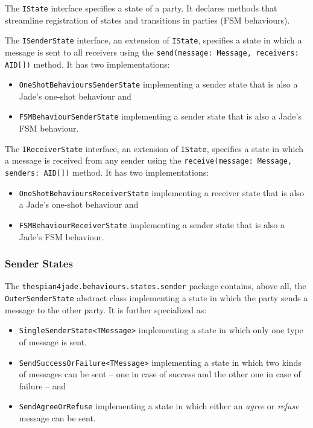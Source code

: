 The \texttt{IState} interface specifies a state of a party.
It declares methods that streamline registration of states and transitions in parties (FSM behaviours).

The \texttt{ISenderState} interface, an extension of \texttt{IState}, specifies a state in which a message is sent to all receivers using the \texttt{send(message: Message, receivers: AID[])} method.
It has two implementations:
\begin{itemize}
	\item \texttt{OneShotBehavioursSenderState} implementing a sender state that is also a Jade's one-shot behaviour and
	\item \texttt{FSMBehaviourSenderState} implementing a sender state that is also a Jade's FSM behaviour.
\end{itemize}

The \texttt{IReceiverState} interface, an extension of \texttt{IState}, specifies a state in which a message is received from any sender using the \texttt{receive(message: Message, senders: AID[])} method.
It has two implementations:
\begin{itemize}
	\item \texttt{OneShotBehavioursReceiverState} implementing a receiver state that is also a Jade's one-shot behaviour and
	\item \texttt{FSMBehaviourReceiverState} implementing a sender state that is also a Jade's FSM behaviour.
\end{itemize}

\subsubsection*{Sender States}

The \texttt{thespian4jade.behaviours.states.sender} package contains, above all, the \texttt{OuterSenderState} abstract class implementing a state in which the party sends a message to the other party.
It is further specialized as:
\begin{itemize}
	\item \texttt{SingleSenderState<TMessage>} implementing a state in which only one type of message is sent,
	\item \texttt{SendSuccessOrFailure<TMessage>} implementing a state in which two kinds of messages can be sent -- one in case of success and the other one in case of failure -- and 
	\item \texttt{SendAgreeOrRefuse} implementing a state in which either an \textit{agree} or \textit{refuse} message can be sent.
\end{itemize}

